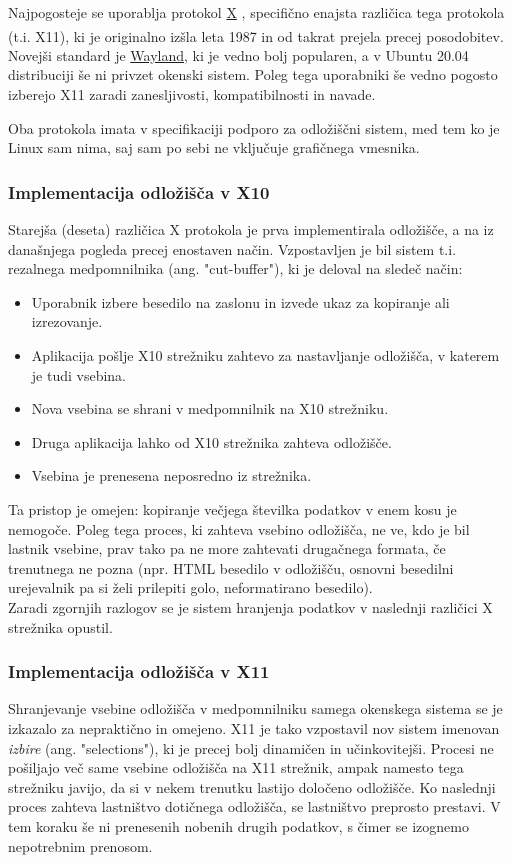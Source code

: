 \documentclass[12pt, A4]{article}
\begin{document}
	Najpogosteje se uporablja protokol \href{https://www.x.org/wiki/}{X} , specifično enajsta različica tega protokola (t.i. X11), ki je originalno izšla leta 1987 in od takrat prejela precej posodobitev\textsuperscript{\cite{xwiki}}. Novejši standard je \href{https://wayland.freedesktop.org/}{Wayland}, ki je vedno bolj popularen, a v Ubuntu 20.04 distribuciji še ni privzet okenski sistem. Poleg tega uporabniki še vedno pogosto izberejo X11 zaradi zanesljivosti, kompatibilnosti in navade.
	
	Oba protokola imata v specifikaciji podporo za odložiščni sistem, med tem ko je Linux sam nima, saj sam po sebi ne vključuje grafičnega vmesnika.
	
	
	\subsubsection{Implementacija odložišča v X10}
	Starejša (deseta) različica X protokola je prva implementirala odložišče, a na iz današnjega pogleda precej enostaven način. Vzpostavljen je bil sistem t.i. rezalnega medpomnilnika (ang. "cut-buffer"), ki je deloval na sledeč način:
	\begin{itemize}
		\item Uporabnik izbere besedilo na zaslonu in izvede ukaz za kopiranje ali izrezovanje.
		\item Aplikacija pošlje X10 strežniku zahtevo za nastavljanje odložišča, v katerem je tudi vsebina.
		\item Nova vsebina se shrani v medpomnilnik na X10 strežniku.
		\item Druga aplikacija lahko od X10 strežnika zahteva odložišče.
		\item Vsebina je prenesena neposredno iz strežnika.
	\end{itemize}
	
	Ta pristop je omejen: kopiranje večjega številka podatkov v enem kosu je nemogoče. Poleg tega proces, ki zahteva vsebino odložišča, ne ve, kdo je bil lastnik vsebine, prav tako pa ne more zahtevati drugačnega formata, če trenutnega ne pozna (npr. HTML besedilo v odložišču, osnovni besedilni urejevalnik pa si želi prilepiti golo, neformatirano besedilo). \\
	
	Zaradi zgornjih razlogov se je sistem hranjenja podatkov v naslednji različici X strežnika opustil.
	
	
	\subsubsection{Implementacija odložišča v X11}
	Shranjevanje vsebine odložišča v medpomnilniku samega okenskega sistema se je izkazalo za nepraktično in omejeno. X11 je tako vzpostavil nov sistem imenovan \textit{izbire} (ang. "selections"), ki je precej bolj dinamičen in učinkovitejši. Procesi ne pošiljajo več same vsebine odložišča na X11 strežnik, ampak namesto tega strežniku javijo, da si v nekem trenutku lastijo določeno odložišče. Ko naslednji proces zahteva lastništvo dotičnega odložišča, se lastništvo preprosto prestavi. V tem koraku še ni prenesenih nobenih drugih podatkov, s čimer se izognemo nepotrebnim prenosom.
	
\end{document}
